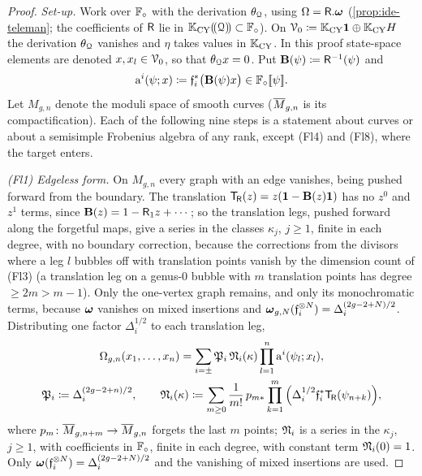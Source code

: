 \begin{proof}
\emph{Set-up.} Work over $\mathbb{F}_{\circ}$ with the derivation $\theta_{\mathcal{Q}}$, using $\Omega=\mathsf{R}.\boldsymbol{\omega}$ (\cref{prop:ide-teleman}; the coefficients of $\mathsf{R}$ lie in $\mathbb{K}_{\mathrm{CY}}(\!(\mathcal{Q})\!)\subset\mathbb{F}_{\circ}$). On $\mathcal{V}_0\coloneqq\mathbb{K}_{\mathrm{CY}}\mathbf{1}\oplus\mathbb{K}_{\mathrm{CY}} H$ the derivation $\theta_{\mathcal{Q}}$ vanishes and $\eta$ takes values in $\mathbb{K}_{\mathrm{CY}}$. In this proof state-space elements are denoted $x,x_l\in\mathcal{V}_0$, so that $\theta_{\mathcal{Q}} x=0$. Put $\mathbf{B}(\psi)\coloneqq\mathsf{R}^{-1}(\psi)$ and
\[
\mathrm{a}^{i}(\psi;x)\coloneqq\mathfrak{f}_i^*\big(\mathbf{B}(\psi)x\big)\in\mathbb{F}_{\circ}[\![ \psi ]\!].
\]
Let $M_{g,n}$ denote the moduli space of smooth curves ($\overline{M}_{g,n}$ is its compactification). Each of the following nine steps is a statement about curves or about a semisimple Frobenius algebra of any rank, except (Fl4) and (Fl8), where the target enters.

\emph{(Fl1) Edgeless form.} On $M_{g,n}$ every graph with an edge vanishes, being pushed forward from the boundary. The translation $\mathsf{T}_{\!\mathsf{R}}(z)=z(\mathbf{1}-\mathbf{B}(z)\mathbf{1})$ has no $z^0$ and $z^1$ terms, since $\mathbf{B}(z)=1-\mathsf{R}_1z+\cdots$; so the translation legs, pushed forward along the forgetful maps, give a series in the classes $\kappa_j$, $j\geq 1$, finite in each degree, with no boundary correction, because the corrections from the divisors where a leg $l$ bubbles off with translation points vanish by the dimension count of (Fl3) (a translation leg on a genus-$0$ bubble with $m$ translation points has degree $\geq 2m>m-1$). Only the one-vertex graph remains, and only its monochromatic terms, because $\boldsymbol{\omega}$ vanishes on mixed insertions and $\boldsymbol{\omega}_{g,N}(\mathfrak{f}_i^{\otimes N})=\Delta_i^{(2g-2+N)/2}$. Distributing one factor $\Delta_i^{1/2}$ to each translation leg,
\begin{equation}
\label{eq:ide-Fl1}
\begin{gathered}
\Omega_{g,n}(x_1,\dots,x_n)=\sum_{i=\pm}\mathfrak{P}_i\,\mathfrak{N}_i(\kappa)\prod_{l=1}^n\mathrm{a}^{i}(\psi_l;x_l),\\
\mathfrak{P}_i\coloneqq\Delta_i^{(2g-2+n)/2},\qquad
\mathfrak{N}_i(\kappa)\coloneqq\sum_{m\geq 0}\frac{1}{m!}\,p_{m*}\prod_{k=1}^m\Big(\Delta_i^{1/2}\mathfrak{f}_i^*\mathsf{T}_{\!\mathsf{R}}(\psi_{n+k})\Big),
\end{gathered}
\end{equation}
where $p_m\colon\overline{M}_{g,n+m}\to\overline{M}_{g,n}$ forgets the last $m$ points; $\mathfrak{N}_i$ is a series in the $\kappa_j$, $j\geq 1$, with coefficients in $\mathbb{F}_{\circ}$, finite in each degree, with constant term $\mathfrak{N}_i(0)=1$. Only $\boldsymbol{\omega}(\mathfrak{f}_i^{\otimes N})=\Delta_i^{(2g-2+N)/2}$ and the vanishing of mixed insertions are used.


\end{proof}
